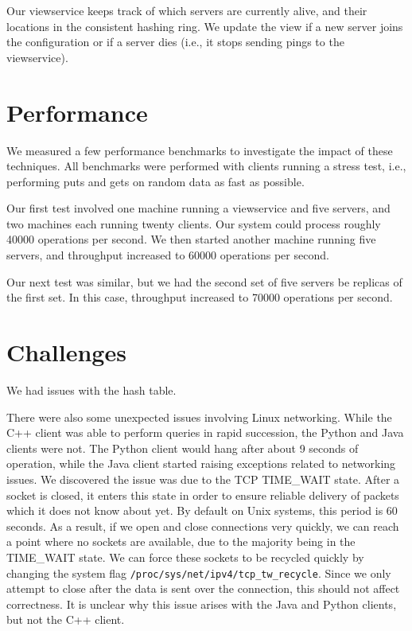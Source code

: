 \documentclass[letterpaper,11pt]{article}
\begin{document}
     Our viewservice keeps track of which servers are currently alive, and their locations in the consistent hashing ring.
     We update the view if a new server joins the configuration or if a server dies (i.e., it stops sending pings to the viewservice).

     \section{Performance}
     We measured a few performance benchmarks to investigate the impact of these techniques.
     All benchmarks were performed with clients running a stress test, i.e., performing puts and gets on random data as fast as possible.

     Our first test involved one machine running a viewservice and five servers, and two machines each running twenty clients.
     Our system could process roughly 40000 operations per second.
     We then started another machine running five servers, and throughput increased to 60000 operations per second.

     Our next test was similar, but we had the second set of five servers be replicas of the first set.
     In this case, throughput increased to 70000 operations per second.

     \section{Challenges}
     We had issues with the hash table.

     There were also some unexpected issues involving Linux networking.
     While the C++ client was able to perform queries in rapid succession, the Python and Java clients were not.
     The Python client would hang after about 9 seconds of operation, while the Java client started raising exceptions related to networking issues.
     We discovered the issue was due to the TCP TIME\_WAIT state.
     After a socket is closed, it enters this state in order to ensure reliable delivery of packets which it does not know about yet.
     By default on Unix systems, this period is 60 seconds.
     As a result, if we open and close connections very quickly, we can reach a point where no sockets are available, due to the majority being in the TIME\_WAIT state.
     We can force these sockets to be recycled quickly by changing the system flag \verb=/proc/sys/net/ipv4/tcp_tw_recycle=.
     Since we only attempt to close after the data is sent over the connection, this should not affect correctness.
     It is unclear why this issue arises with the Java and Python clients, but not the C++ client.




\end{document}
